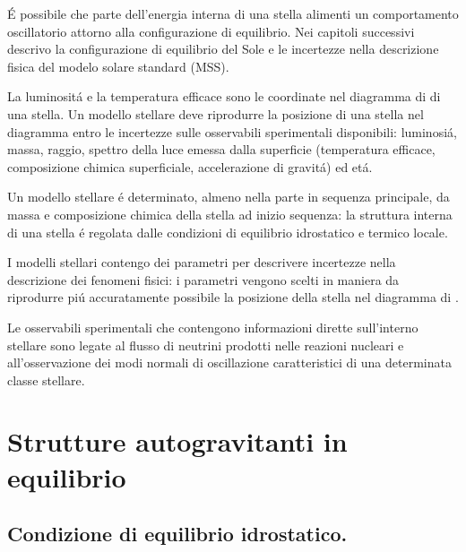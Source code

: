\documentclass[../main.tex]{subfiles}
\begin{document}
\begingroup
\color{midnightblue}
\'E possibile che parte dell'energia interna di una stella alimenti un comportamento oscillatorio attorno alla configurazione di equilibrio. Nei capitoli successivi descrivo la configurazione di equilibrio del Sole e le incertezze nella descrizione fisica del modelo solare standard (MSS).

\endgroup

\begingroup
\color{midnightblue}
La luminosit\'a e la temperatura efficace sono le coordinate nel diagramma di \hr{} di una stella. Un modello stellare deve riprodurre la posizione di una stella nel diagramma entro le incertezze sulle osservabili sperimentali disponibili: luminosi\'a, massa, raggio, spettro della luce emessa dalla superficie (temperatura efficace, composizione chimica superficiale, accelerazione di gravit\'a) ed et\'a.

Un modello stellare \'e determinato, almeno nella parte in sequenza principale, da massa e composizione chimica della stella ad inizio sequenza: la struttura interna di una stella \'e regolata dalle condizioni di equilibrio idrostatico e termico locale.

I modelli stellari contengo dei parametri per descrivere incertezze nella descrizione dei fenomeni fisici: i parametri vengono scelti in maniera da riprodurre pi\'u accuratamente possibile la posizione della stella nel diagramma di \hr{}.

Le osservabili sperimentali che contengono informazioni dirette sull'interno stellare sono legate al flusso di neutrini prodotti nelle reazioni nucleari e all'osservazione dei modi normali di oscillazione caratteristici di una determinata classe stellare.

\endgroup



\clearpage


{\let\clearpage\relax \chapter{Strutture autogravitanti in equilibrio}}


\section{Condizione di equilibrio idrostatico.}
\end{document}
